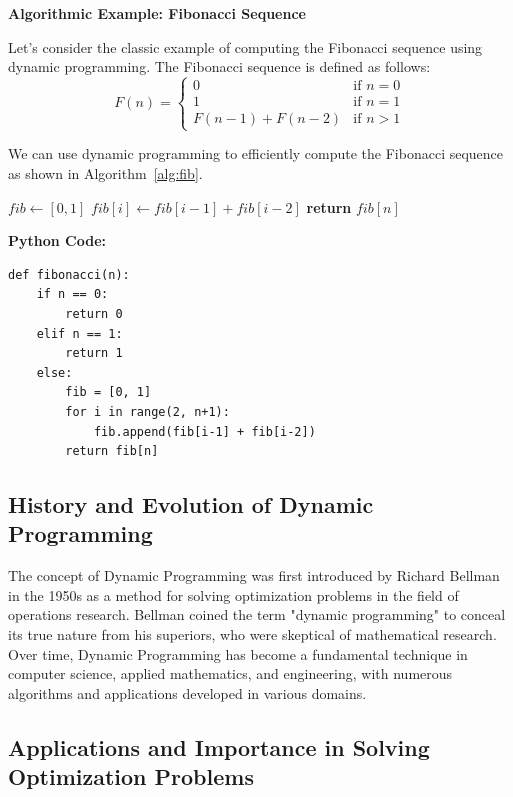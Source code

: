 \documentclass[12pt]{book} %
\begin{document}
\FloatBarrier
\textbf{Algorithmic Example: Fibonacci Sequence}

Let's consider the classic example of computing the Fibonacci sequence using dynamic programming. The Fibonacci sequence is defined as follows:
\[
F(n) =
\begin{cases}
0 & \text{if } n=0 \\
1 & \text{if } n=1 \\
F(n-1) + F(n-2) & \text{if } n > 1
\end{cases}
\]

We can use dynamic programming to efficiently compute the Fibonacci sequence as shown in Algorithm~\ref{alg:fib}. 
\FloatBarrier
\begin{algorithm}
\caption{Dynamic Programming for Fibonacci Sequence}
\label{alg:fib}
\begin{algorithmic}[1]
\State $fib \gets [0, 1]$
\State $fib[i] \gets fib[i-1] + fib[i-2]$
\EndFor
\State \textbf{return} $fib[n]$
\EndFunction
\end{algorithmic}
\end{algorithm}
\FloatBarrier
\textbf{Python Code:}
\FloatBarrier
\begin{lstlisting}
def fibonacci(n):
    if n == 0:
        return 0
    elif n == 1:
        return 1
    else:
        fib = [0, 1]
        for i in range(2, n+1):
            fib.append(fib[i-1] + fib[i-2])
        return fib[n]
\end{lstlisting}
\FloatBarrier

\subsection{History and Evolution of Dynamic Programming}

The concept of Dynamic Programming was first introduced by Richard Bellman in the 1950s as a method for solving optimization problems in the field of operations research. Bellman coined the term "dynamic programming" to conceal its true nature from his superiors, who were skeptical of mathematical research. Over time, Dynamic Programming has become a fundamental technique in computer science, applied mathematics, and engineering, with numerous algorithms and applications developed in various domains.

\subsection{Applications and Importance in Solving Optimization Problems}
\end{document}
